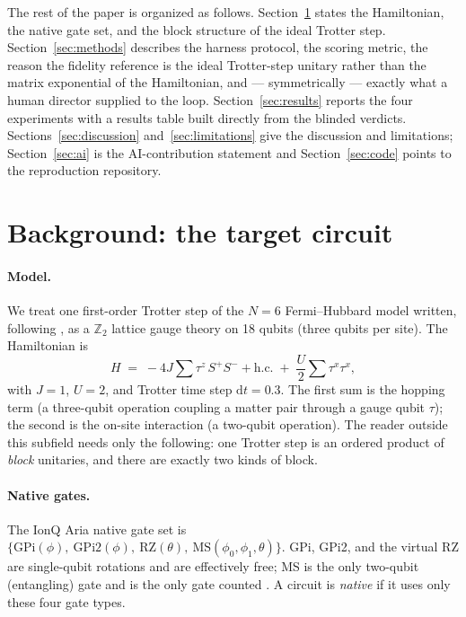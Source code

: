 \documentclass[11pt]{article}
\begin{document}
The rest of the paper is organized as follows. Section~\ref{sec:background} states
the Hamiltonian, the native gate set, and the block structure of the ideal Trotter
step. Section~\ref{sec:methods} describes the harness protocol, the scoring metric,
the reason the fidelity reference is the ideal Trotter-step unitary rather than the
matrix exponential of the Hamiltonian, and --- symmetrically --- exactly what a human
director supplied to the loop. Section~\ref{sec:results} reports the four
experiments with a results table built directly from the blinded verdicts.
Sections~\ref{sec:discussion} and~\ref{sec:limitations} give the discussion and
limitations; Section~\ref{sec:ai} is the AI-contribution statement and
Section~\ref{sec:code} points to the reproduction repository.

\section{Background: the target circuit}
\label{sec:background}

\paragraph{Model.} We treat one first-order Trotter step \cite{Lloyd1996,Suzuki1976}
of the $N=6$ Fermi--Hubbard model \cite{Hubbard1963} written, following
\cite{Srinivasan2024}, as a $\mathbb{Z}_2$ lattice gauge theory on 18 qubits (three
qubits per site). The Hamiltonian is
\begin{equation}
H \;=\; -4J \sum \tau^{z}\, S^{+}S^{-} + \mathrm{h.c.}
        \;+\; \frac{U}{2} \sum \tau^{x}\tau^{x},
\label{eq:ham}
\end{equation}
with $J=1$, $U=2$, and Trotter time step $\mathrm{d}t = 0.3$. The first sum is the
hopping term (a three-qubit operation coupling a matter pair through a gauge
qubit $\tau$); the second is the on-site interaction (a two-qubit operation).
The reader outside this subfield needs only the following: one Trotter step is an
ordered product of \emph{block} unitaries, and there are exactly two kinds of block.

\paragraph{Native gates.} The IonQ Aria native gate set is
$\{\mathrm{GPi}(\phi),\ \mathrm{GPi2}(\phi),\ \mathrm{RZ}(\theta),\
\mathrm{MS}(\phi_0,\phi_1,\theta)\}$. GPi, GPi2, and the virtual RZ are
single-qubit rotations and are effectively free; MS is the only two-qubit
(entangling) gate and is the only gate counted \cite{Maslov2017}. A circuit is
\emph{native} if it uses only these four gate types.
\end{document}
